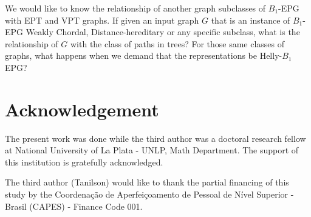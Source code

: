 \documentclass[9pt]{entcs}
\begin{document}
We would like to know the relationship of another graph subclasses of $B_1$-EPG with EPT and VPT graphs. If given an  input graph $G$ that is an instance of $B_1$-EPG  Weakly Chordal,  Distance-hereditary or any specific subclass, what is the relationship of $G$ with the class of paths in trees? For those same classes of graphs, what happens when we demand that the representations be Helly-$B_1$ EPG?


 
%


\section*{Acknowledgement}

The present work was done while the third author was a doctoral research fellow at National University of La Plata - UNLP, Math Department. The support of this institution is gratefully acknowledged.

The third author (Tanilson) would like to thank the partial financing of this study by the Coordena{\c c}\~ao de Aperfei{\c c}oamento de Pessoal de N\'ivel Superior - Brasil (CAPES) - Finance Code 001.

\newcommand{\newblock}{} %

\end{document}
